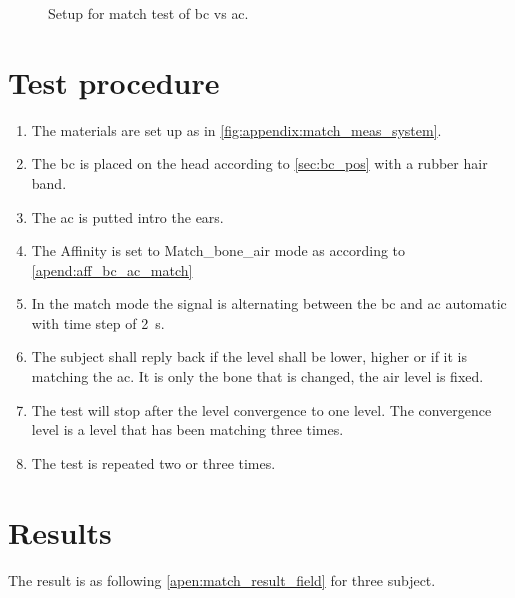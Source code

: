 \begin{figure}[H]
\centering
\def\svgwidth{\columnwidth}

\caption{Setup for match test of \gls{bc} vs \gls{ac}.}
		\label{fig:appendix:match_meas_system}
\end{figure}

\section*{Test procedure}


\begin{enumerate}
\item The materials are set up as in \autoref{fig:appendix:match_meas_system}.
\item The \gls{bc} is placed on the head according to \autoref{sec:bc_pos} with a rubber hair band.
\item The \gls{ac} is putted intro the ears.
\item The Affinity is set to Match_bone_air mode as according to \autoref{apend:aff_bc_ac_match} 
\item In the match mode the signal is alternating between the \gls{bc} and \gls{ac} automatic with time step of \SI{2}{\second}.
\item The  subject shall reply back if the level shall be lower, higher or if it is matching  the \gls{ac}. It is only the bone that is changed, the air level is fixed.
\item The test will stop after the level convergence to one level. The convergence level is a level that has been matching three times.
\item The test is repeated two or three times.
\end{enumerate}

\section*{Results}

The result is as following \autoref{apen:match_result_field} for three subject. 

